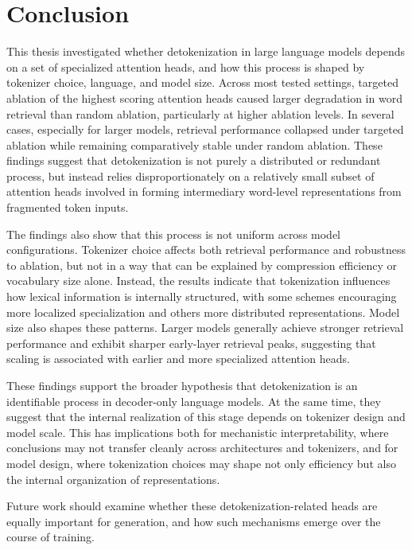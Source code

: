 \chapter{Conclusion} \label{cha:conclusion}

This thesis investigated whether detokenization in large language models depends on a set of specialized attention heads, and how this process is shaped by tokenizer choice, language, and model size. Across most tested settings, targeted ablation of the highest scoring attention heads caused larger degradation in word retrieval than random ablation, particularly at higher ablation levels. In several cases, especially for larger models, retrieval performance collapsed under targeted ablation while remaining comparatively stable under random ablation. These findings suggest that detokenization is not purely a distributed or redundant process, but instead relies disproportionately on a relatively small subset of attention heads involved in forming intermediary word-level representations from fragmented token inputs.

The findings also show that this process is not uniform across model configurations. Tokenizer choice affects both retrieval performance and robustness to ablation, but not in a way that can be explained by compression efficiency or vocabulary size alone. Instead, the results indicate that tokenization influences how lexical information is internally structured, with some schemes encouraging more localized specialization and others more distributed representations. Model size also shapes these patterns. Larger models generally achieve stronger retrieval performance and exhibit sharper early-layer retrieval peaks, suggesting that scaling is associated with earlier and more specialized attention heads.

These findings support the broader hypothesis that detokenization is an identifiable process in decoder-only language models. At the same time, they suggest that the internal realization of this stage depends on tokenizer design and model scale. This has implications both for mechanistic interpretability, where conclusions may not transfer cleanly across architectures and tokenizers, and for model design, where tokenization choices may shape not only efficiency but also the internal organization of representations.

Future work should examine whether these detokenization-related heads are equally important for generation, and how such mechanisms emerge over the course of training.
